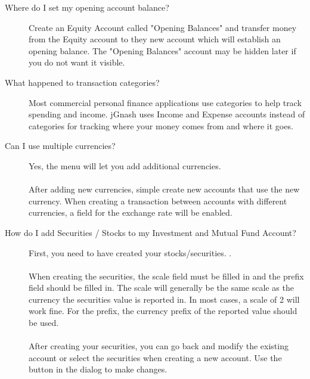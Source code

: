 \documentclass[letterpaper,12pt]{book}
\begin{document}
    \begin{description}
        \item[Where do I set my opening account balance?]
        Create an Equity Account called "Opening Balances" and transfer money from the Equity account to they
        new account which will establish an opening balance.
        The "Opening Balances" account may be hidden later if you do not want it visible.
        \item[What happened to transaction categories?]
        Most commercial personal finance applications use categories to help track spending and income.
        jGnash uses Income and Expense accounts instead of categories for tracking where your money
        comes from and where it goes.
        \item[Can I use multiple currencies?]
        Yes, the  menu will let you add additional currencies.
        \\ \\
        After adding new currencies, simple create new accounts that use the new currency.
        When creating a transaction between accounts with different currencies, a field for the exchange rate will be enabled.
        \item[How do I add Securities / Stocks to my Investment and Mutual Fund Account?]
        First, you need to have created your stocks/securities. .
        \\ \\
        When creating the securities, the scale field must be filled in and the prefix field should be filled in.
        The scale will generally be the same scale as the currency the securities value is reported in.
        In most cases, a scale of 2 will work fine.
        For the prefix, the currency prefix of the reported value should be used.
        \\ \\
        After creating your securities, you can go back and modify the existing account or select the securities when
        creating a new account.
        Use the  button in the dialog to make changes.
    \end{description}
\end{document}

